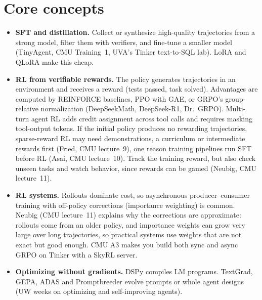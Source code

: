 \documentclass[10pt,oneside]{report}
\begin{document}
\section{Core concepts}
\begin{itemize}
\item \textbf{SFT and distillation.} Collect or synthesize high-quality trajectories from a strong model, filter them with verifiers, and fine-tune a smaller model (TinyAgent, CMU Training~1, UVA's Tinker text-to-SQL lab). LoRA and QLoRA make this cheap.
\item \textbf{RL from verifiable rewards.} The policy generates trajectories in an environment and receives a reward (tests passed, task solved). Advantages are computed by REINFORCE baselines, PPO with GAE, or GRPO's group-relative normalization (DeepSeekMath, DeepSeek-R1, Dr.~GRPO). Multi-turn agent RL adds credit assignment across tool calls and requires masking tool-output tokens. If the initial policy produces no rewarding trajectories, sparse-reward RL may need demonstrations, a curriculum or intermediate rewards first (Fried, CMU lecture~9), one reason training pipelines run SFT before RL (Asai, CMU lecture~10). Track the training reward, but also check unseen tasks and watch behavior, since rewards can be gamed (Neubig, CMU lecture~11).
\item \textbf{RL systems.} Rollouts dominate cost, so asynchronous producer--consumer training with off-policy corrections (importance weighting) is common. Neubig (CMU lecture~11) explains why the corrections are approximate: rollouts come from an older policy, and importance weights can grow very large over long trajectories, so practical systems use weights that are not exact but good enough. CMU A3 makes you build both sync and async GRPO on Tinker with a SkyRL server.
\item \textbf{Optimizing without gradients.} DSPy compiles LM programs. TextGrad, GEPA, ADAS and Promptbreeder evolve prompts or whole agent designs (UW weeks on optimizing and self-improving agents).
\end{itemize}
\end{document}
